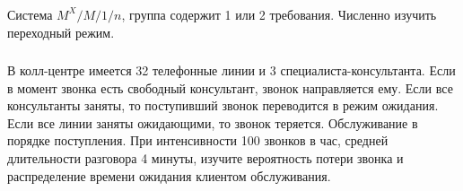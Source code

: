 \documentclass[12pt]{extarticle}
\begin{document}
\subsubsection{}
  Система $M^X/M/1/n$, группа содержит 1 или 2 требования. Численно изучить
  переходный режим.

\subsubsection{}
  В колл-центре имеется 32 телефонные линии и 3 специалиста-консультанта. Если в
  момент звонка есть свободный консультант, звонок направляется ему. Если все
  консультанты заняты, то поступивший звонок переводится в режим ожидания. Если
  все линии заняты ожидающими, то звонок теряется. Обслуживание в порядке
  поступления. При интенсивности 100 звонков в час, средней длительности
  разговора 4 минуты, изучите вероятность потери звонка и распределение времени
  ожидания клиентом обслуживания.
\newpage
\tableofcontents
\end{document}
